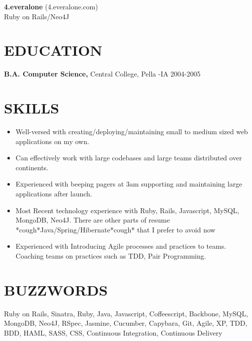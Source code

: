 \documentclass{res}
\begin{document}
\begin{resume}
    {\bf 4.everalone} (4.everalone.com)
    \\Ruby on Rails/Neo4J

\section{EDUCATION}
    {\bf B.A. Computer Science,} Central College, Pella -IA
    2004-2005


\section{SKILLS}          
 \begin{itemize} \itemsep -2pt  %
\item Well-versed with creating/deploying/maintaining small to medium sized web applications on my own.
\item Can effectively work with large codebases and large teams distributed over continents.
\item Experienced with beeping pagers at 3am supporting and maintaining large applications after launch.
\item Most Recent technology experience with Ruby, Rails, Javascript, MySQL, MongoDB, Neo4J. There are other parts of resume *cough*Java/Spring/Hibernate*cough* that I prefer to avoid now
\item Experienced with Introducing Agile processes and practices to teams. Coaching teams on practices such as TDD, Pair Programming.

 \end{itemize}


\section{BUZZWORDS}          
Ruby on Rails, Sinatra, Ruby, Java, Javascript, Coffeescript, Backbone, MySQL, MongoDB, Neo4J, RSpec, Jasmine, Cucumber, Capybara, Git, Agile, XP, TDD, BDD, HAML, SASS, CSS, Continuous Integration, Continuous Delivery 
 
\end{resume}
\end{document}
